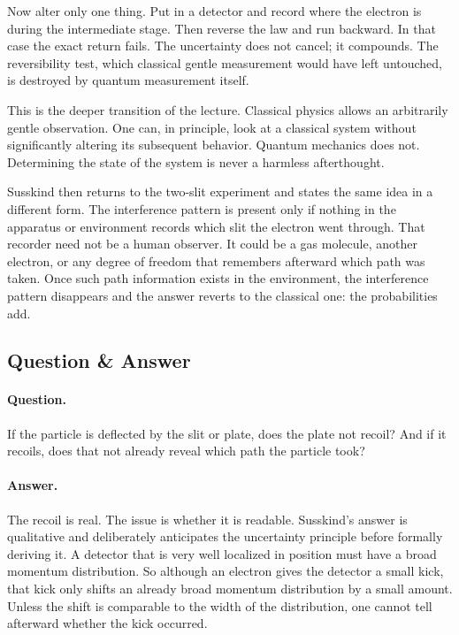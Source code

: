 Now alter only one thing. Put in a detector and record where the electron is during the intermediate stage. Then reverse the law and run backward. In that case the exact return fails. The uncertainty does not cancel; it compounds. The reversibility test, which classical gentle measurement would have left untouched, is destroyed by quantum measurement itself.

This is the deeper transition of the lecture. Classical physics allows an arbitrarily gentle observation. One can, in principle, look at a classical system without significantly altering its subsequent behavior. Quantum mechanics does not. Determining the state of the system is never a harmless afterthought.

Susskind then returns to the two-slit experiment and states the same idea in a different form. The interference pattern is present only if nothing in the apparatus or environment records which slit the electron went through. That recorder need not be a human observer. It could be a gas molecule, another electron, or any degree of freedom that remembers afterward which path was taken. Once such path information exists in the environment, the interference pattern disappears and the answer reverts to the classical one: the probabilities add.

\subsection{Question \& Answer}

\paragraph{Question.} If the particle is deflected by the slit or plate, does the plate not recoil? And if it recoils, does that not already reveal which path the particle took?

\paragraph{Answer.} The recoil is real. The issue is whether it is readable. Susskind's answer is qualitative and deliberately anticipates the uncertainty principle before formally deriving it. A detector that is very well localized in position must have a broad momentum distribution. So although an electron gives the detector a small kick, that kick only shifts an already broad momentum distribution by a small amount. Unless the shift is comparable to the width of the distribution, one cannot tell afterward whether the kick occurred.

